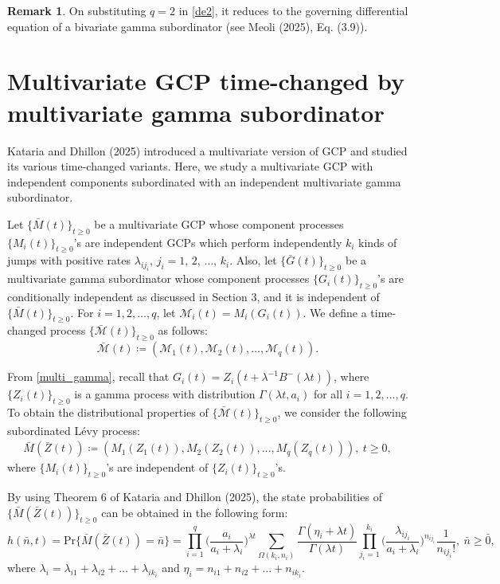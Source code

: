 \documentclass[12pt,oneside,reqno]{amsart}
\numberwithin{equation}{section}
\theoremstyle{definition}
\numberwithin{equation}{section}
\newtheorem{remark}{\bf Remark}[section]
\theoremstyle{remarkstyle}
\begin{document}
\begin{remark}
On substituting $q=2$ in \eqref{de2}, it reduces to the governing differential equation of a bivariate gamma subordinator (see Meoli (2025), Eq. (3.9)).
\end{remark}









\section{Multivariate GCP time-changed by multivariate gamma subordinator}
Kataria and Dhillon (2025) introduced a multivariate version of GCP and studied its various time-changed variants. Here, we study a multivariate GCP with independent components subordinated with  an independent multivariate gamma subordinator. 

Let $\{\bar{M}(t)\}_{t\ge0}$ be a multivariate GCP whose component processes $\{M_i(t)\}_{t\geq0}$'s are independent GCPs which perform independently $k_i$ kinds of jumps with positive rates $\lambda_{ij_i}$, $j_i=1$, $2$, $\dots$, $k_i$. Also, let $\{\bar{G}(t)\}_{t\geq0}$ be a multivariate gamma subordinator whose component processes $\{G_i(t)\}_{t \geq 0}$'s are conditionally independent as discussed in Section 3, and it is independent of  $\{\bar{M}(t)\}_{t\ge0}$. For $i=1,2,\dots,q$, let $\mathscr{M}_i(t)=M_i(G_i(t))$. We define a time-changed process $\{\bar{\mathscr{M}}(t)\}_{t\geq0}$ as follows:
\begin{equation}\label{timechn}
\bar{\mathscr{M}}(t)\coloneqq(\mathscr{M}_1(t), \mathscr{M}_2(t), \dots,\mathscr{M}_q(t)).
\end{equation}
	
From \eqref{multi_gamma}, recall that $G_i(t)=Z_i(t+\lambda^{-1}B^{-}(\lambda t))$, where $\{Z_i(t)\}_{t\ge0}$ is a gamma process with distribution $\Gamma(\lambda t, a_i)$ for all $i=1,2,\dots,q$. To obtain the distributional properties of $\{\bar{\mathscr{M}}(t)\}_{t\geq0}$, we consider the following subordinated L\'evy process: 
\begin{align*}
\bar{M}(\bar{Z}(t))\coloneq(M_1(Z_1(t)),M_2(Z_2(t)),\dots,M_q(Z_q(t))),\ t\ge0,
\end{align*} 
where $\{M_i(t)\}_{t\ge0}$'s are independent of $\{Z_i(t)\}_{t\ge0}$'s.

By using Theorem 6 of Kataria and Dhillon (2025), the state probabilities of $\{\bar{M}(\bar{Z}(t))\}_{t\ge 0}$ can be obtained in the following form:
{\footnotesize	\begin{equation}\label{stateMZ}
h(\bar{n},t)=\mathrm{Pr}\{\bar{M}(\bar{Z}(t))=\bar{n}\}=\prod_{i=1}^{q}\Big(\frac{a_i}{a_i+\lambda_i}\Big)^{\lambda t}\sum_{\Omega(k_i,n_i)}\frac{\Gamma(\eta_i+\lambda t)}{\Gamma(\lambda t)}\prod_{j_i=1}^{k_i}\Big(\frac{\lambda_{ij_i}}{a_i+\lambda_i}\Big)^{n_{ij_i}}\frac{1}{n_{ij_i}!},\ \bar{n}\ge \bar{0},
\end{equation}}
where $\lambda_i=\lambda_{i1}+\lambda_{i2}+\dots+\lambda_{ik_i}$ and $\eta_i=n_{i1}+n_{i2}+\dots+n_{ik_i}$.
	
\end{document}
